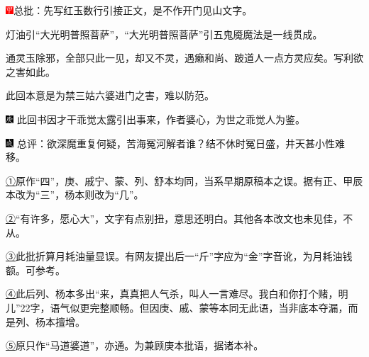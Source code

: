\includegraphics[width=3mm]{../Images/00002}{总批：先写红玉数行引接正文，是不作开门见山文字。}

{灯油引``大光明普照菩萨''，``大光明普照菩萨''引五鬼魇魔法是一线贯成。}

{通灵玉除邪，全部只此一见，却又不灵，遇癞和尚、跛道人一点方灵应矣。写利欲之害如此。}

{此回本意是为禁三姑六婆进门之害，难以防范。}

{{\includegraphics[width=3mm]{../Images/00004} \kaishu 此回书因才干乖觉太露引出事来，作者婆心，为世之乖觉人为鉴。}}

{\includegraphics[width=3mm]{../Images/00005}  \kaishu 总评：欲深魔重复何疑，苦海冤河解者谁？结不休时冤日盛，井天甚小性难移。}


{}

{\href{../Text/part0029_split_000.html\#navto_1_a}{①}原作``四''，庚、戚宁、蒙、列、舒本均同，当系早期原稿本之误。据有正、甲辰本改为``三''，杨本则改为``几''。}

{\href{../Text/part0029_split_000.html\#navto_2_a}{②}``有许多，愿心大''，文字有点别扭，意思还明白。其他各本改文也未见佳，不从。}

{\href{../Text/part0029_split_000.html\#navto_3_a}{③}此批折算月耗油量显误。有网友提出后一``斤''字应为``金''字音讹，为月耗油钱额。可参考。}

{\href{../Text/part0029_split_000.html\#navto_4_a}{④}此后列、杨本多出``来，真真把人气杀，叫人一言难尽。我白和你打个赌，明儿''22字，语气似更完整顺畅。但因庚、戚、蒙等本同无此语，当非底本夺漏，而是列、杨本擅增。}

{\href{../Text/part0029_split_000.html\#navto_5_a}{⑤}原只作``马道婆道''，亦通。为兼顾庚本批语，据诸本补。}
